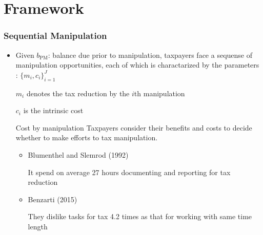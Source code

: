 \documentclass[dvipdfmx,12pt]{beamer}
\begin{document}
\section{Framework}
\begin{frame}\frametitle{Sequential Manipulation}
  \begin{itemize}

    \item Given $b_{\text{PM}}$: balance due prior to manipulation,
    taxpayers face a sequense of manipulation opportunities,
    each of which is charactarized by the parameters
    : $\{ m_i, c_i \} _{i=1} ^{J}$

    $m_i$ denotes the tax reduction by the $i$th manipulation

    $c_i$ is the intrinsic cost

    \begin{block}{Cost by manipulation}
      \footnotesize
      Taxpayers consider their benefits and costs to decide whether to
      make efforts to tax manipulation.

      \begin{itemize}
        \scriptsize
        \item Blumenthel and Slemrod (1992)

        It spend on average 27 hours documenting and reporting for tax
        reduction

        \item Benzarti (2015)

        They dislike tasks for tax 4.2 times as that for working with
        same time length
      \end{itemize}

    \end{block}
  \end{itemize}
\end{frame}
\end{document}
